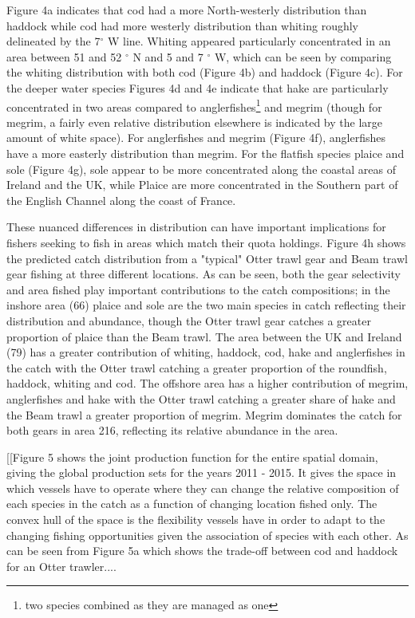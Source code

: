 \documentclass{nature}
\begin{document}
\begin{linenumbers}
Figure 4a indicates that cod had a more North-westerly distribution than
haddock while cod had more westerly distribution than whiting roughly
delineated by the 7$^{\circ}$ W line. Whiting appeared particularly
concentrated in an area between 51 and 52 $^{\circ}$ N and 5 and 7 $^{\circ}$
W, which can be seen by comparing the whiting distribution with both cod
(Figure 4b) and haddock (Figure 4c). For the deeper water species Figures 4d
and 4e indicate that hake are particularly concentrated in two areas compared
to anglerfishes\footnote{two species combined as they are managed as one} and
megrim (though for megrim, a fairly even relative distribution elsewhere is
indicated by the large amount of white space). For anglerfishes and megrim
(Figure 4f), anglerfishes have a more easterly distribution than megrim. For
the flatfish species plaice and sole (Figure 4g), sole appear to be more
concentrated along the coastal areas of Ireland and the UK, while Plaice are
more concentrated in the Southern part of the English Channel along the coast
of France.

These nuanced differences in distribution can have important implications for
fishers seeking to fish in areas which match their quota holdings. Figure 4h
shows the predicted catch distribution from a "typical" Otter trawl gear and
Beam trawl gear fishing at three different locations. As can be seen, both the
gear selectivity and area fished play important contributions to the catch
compositions; in the inshore area (66) plaice and sole are the two main species
in catch reflecting their distribution and abundance, though the Otter trawl
gear catches a greater proportion of plaice than the Beam trawl. The area
between the UK and Ireland (79) has a greater contribution of whiting, haddock,
cod, hake and anglerfishes in the catch with the Otter trawl catching a greater
proportion of the roundfish, haddock, whiting and cod. The offshore area has a
higher contribution of megrim, anglerfishes and hake with the Otter trawl
catching a greater share of hake and the Beam trawl a greater proportion of
megrim. Megrim dominates the catch for both gears in area 216, reflecting its
relative abundance in the area.

[[Figure 5 shows the joint production function for the entire spatial domain,
giving the global production sets for the years 2011 - 2015. It gives the space
in which vessels have to operate where they can change the relative composition
of each species in the catch as a function of changing location fished only.
The convex hull of the space is the flexibility vessels have in order to adapt
to the changing fishing opportunities given the association of species with
each other\cite{Reimer2017}. As can be seen from Figure 5a which shows the
trade-off between cod and haddock for an Otter trawler....


\end{linenumbers}
\end{document}
